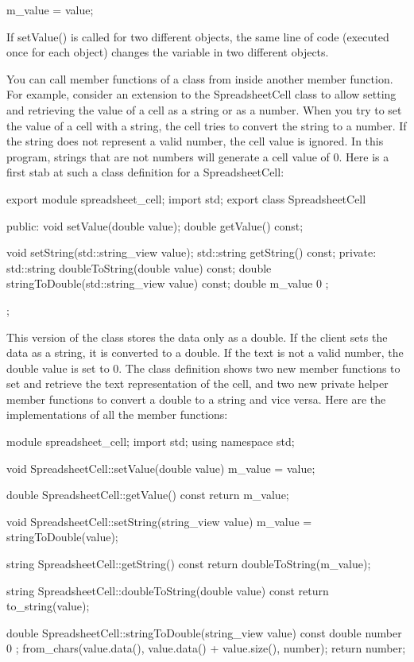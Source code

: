 \begin{cpp}
m_value = value;
\end{cpp}

If setValue() is called for two different objects, the same line of code (executed once for each object) changes the variable in two different objects.


You can call member functions of a class from inside another member function. For example, consider an extension to the SpreadsheetCell class to allow setting and retrieving the value of a cell as a string or as a number. When you try to set the value of a cell with a string, the cell tries to convert the string to a number. If the string does not represent a valid number, the cell value is ignored. In this program, strings that are not numbers will generate a cell value of 0. Here is a first stab at such a class definition for a SpreadsheetCell:

\begin{cpp}
export module spreadsheet_cell;
import std;
export class SpreadsheetCell
{
    public:
        void setValue(double value);
        double getValue() const;

        void setString(std::string_view value);
        std::string getString() const;
    private:
        std::string doubleToString(double value) const;
        double stringToDouble(std::string_view value) const;
        double m_value { 0 };
};
\end{cpp}

This version of the class stores the data only as a double. If the client sets the data as a string, it is converted to a double. If the text is not a valid number, the double value is set to 0. The class definition shows two new member functions to set and retrieve the text representation of the cell, and two new private helper member functions to convert a double to a string and vice versa. Here are the implementations of all the member functions:

\begin{cpp}
module spreadsheet_cell;
import std;
using namespace std;

void SpreadsheetCell::setValue(double value)
{
    m_value = value;
}

double SpreadsheetCell::getValue() const
{
    return m_value;
}

void SpreadsheetCell::setString(string_view value)
{
    m_value = stringToDouble(value);
}

string SpreadsheetCell::getString() const
{
    return doubleToString(m_value);
}

string SpreadsheetCell::doubleToString(double value) const
{
    return to_string(value);
}

double SpreadsheetCell::stringToDouble(string_view value) const
{
    double number { 0 };
    from_chars(value.data(), value.data() + value.size(), number);
    return number;
}
\end{cpp}

